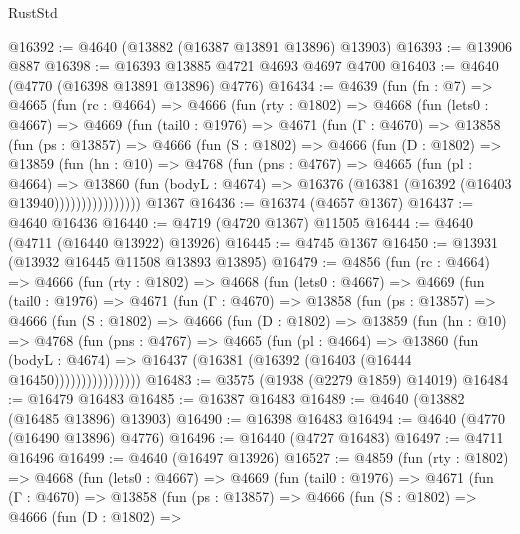 \begin{lexlean}{RustStd}
\begin{coremodule}
@16392 := @4640 (@13882 (@16387 @13891 @13896) @13903)
@16393 := @13906 @887
@16398 := @16393 @13885 @4721 @4693 @4697 @4700
@16403 := @4640 (@4770 (@16398 @13891 @13896) @4776)
@16434 := @4639
    (fun (fn : @7) =>
    @4665
      (fun (rc : @4664) =>
      @4666
        (fun (rty : @1802) =>
        @4668
          (fun (lets0 : @4667) =>
          @4669
            (fun (tail0 : @1976) =>
            @4671
              (fun (Γ : @4670) =>
              @13858
                (fun (ps : @13857) =>
                @4666
                  (fun (S : @1802) =>
                  @4666
                    (fun (D : @1802) =>
                    @13859
                      (fun (hn : @10) =>
                      @4768
                        (fun (pns : @4767) =>
                        @4665
                          (fun (pl : @4664) =>
                          @13860
                            (fun (bodyL : @4674) =>
                            @16376 (@16381 (@16392 (@16403 @13940))))))))))))))))
    @1367
@16436 := @16374 (@4657 @1367)
@16437 := @4640 @16436
@16440 := @4719 (@4720 @1367) @11505
@16444 := @4640 (@4711 (@16440 @13922) @13926)
@16445 := @4745 @1367
@16450 := @13931 (@13932 @16445 @11508 @13893 @13895)
@16479 := @4856
    (fun (rc : @4664) =>
    @4666
      (fun (rty : @1802) =>
      @4668
        (fun (lets0 : @4667) =>
        @4669
          (fun (tail0 : @1976) =>
          @4671
            (fun (Γ : @4670) =>
            @13858
              (fun (ps : @13857) =>
              @4666
                (fun (S : @1802) =>
                @4666
                  (fun (D : @1802) =>
                  @13859
                    (fun (hn : @10) =>
                    @4768
                      (fun (pns : @4767) =>
                      @4665
                        (fun (pl : @4664) =>
                        @13860
                          (fun (bodyL : @4674) =>
                          @16437 (@16381 (@16392 (@16403 (@16444 @16450))))))))))))))))
@16483 := @3575 (@1938 (@2279 @1859) @14019)
@16484 := @16479 @16483
@16485 := @16387 @16483
@16489 := @4640 (@13882 (@16485 @13896) @13903)
@16490 := @16398 @16483
@16494 := @4640 (@4770 (@16490 @13896) @4776)
@16496 := @16440 (@4727 @16483)
@16497 := @4711 @16496
@16499 := @4640 (@16497 @13926)
@16527 := @4859
    (fun (rty : @1802) =>
    @4668
      (fun (lets0 : @4667) =>
      @4669
        (fun (tail0 : @1976) =>
        @4671
          (fun (Γ : @4670) =>
          @13858
            (fun (ps : @13857) =>
            @4666
              (fun (S : @1802) =>
              @4666
                (fun (D : @1802) =>

\end{coremodule}
\end{lexlean}
